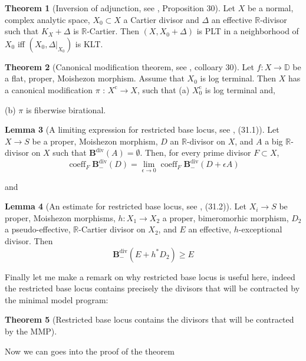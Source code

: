 \documentclass[11pt]{article}
\theoremstyle{definition}
\newtheorem{theorem}{Theorem}
\newtheorem{lemma}[theorem]{Lemma}
\begin{document}
	\begin{theorem}[Inversion of adjunction, see \cite{Moishezonmorphism}, Proposition 30]\label{inversion}
		Let $X$ be a normal, complex analytic space, $X_0 \subset X$ a Cartier divisor and $\Delta$ an effective $\mathbb{R}$-divisor such that $K_X+\Delta$ is $\mathbb{R}$-Cartier. Then $\left(X, X_0+\Delta\right)$ is PLT in a neighborhood of $X_0$ iff $\left(X_0,\left.\Delta\right|_{X_0}\right)$ is KLT.
	\end{theorem}
	\begin{theorem}[Canonical modification theorem, see \cite{Moishezonmorphism}, colloary 30]
		Let $f: X \rightarrow \mathbb{D}$ be a flat, proper, Moishezon morphism. Assume that $X_0$ is log terminal. 
		Then $X$ has a canonical modification $\pi$ : $X^{\mathrm{c}} \rightarrow X$, such that
		(a) $X_0^{\mathrm{c}}$ is log terminal and,
		
		(b) $\pi$ is fiberwise birational.
		
	\end{theorem}
	\begin{lemma}[A limiting expression for restricted base locus, see \cite{Moishezonmorphism}, (31.1)]
		Let $X \rightarrow S$ be a proper, Moishezon morphism, $D$ an $\mathbb{R}$-divisor on $X$, and $A$ a big $\mathbb{R}$-divisor on $X$ such that $\mathbf{B}^{\operatorname{div}}(A)=\emptyset$. Then, for every prime divisor $F \subset X$,
		$$
		\operatorname{coeff}_F \mathbf{B}_{-}^{\mathrm{div}}(D)=\lim _{\epsilon \rightarrow 0} \operatorname{coeff}_F \mathbf{B}_{-}^{\mathrm{div}}(D+\epsilon A)
		$$
	\end{lemma}
	and
	\begin{lemma}[An estimate for restricted base locus, see \cite{Moishezonmorphism}, (31.2)]
	Let $X_i \rightarrow S$ be proper, Moishezon morphisms, $h: X_1 \rightarrow X_2$ a proper, bimeromorhic morphism, $D_2$ a pseudo-effective, $\mathbb{R}$-Cartier divisor on $X_2$, and $E$ an effective, $h$-exceptional divisor. Then $$ \mathbf{B}_{-}^{\mathrm{div}}\left(E+h^* D_2\right) \geq E$$
	\end{lemma}
	Finally let me make a remark on why restricted base locus is useful here, indeed the restricted base locus contains precisely the divisors that will be contracted by the minimal model program:
	\begin{theorem}[Restricted base locus contains the divisors that will be contracted by the MMP]\label{Restrictedbase}
	
	\end{theorem}
	Now we can goes into the proof of the theorem
\end{document}
